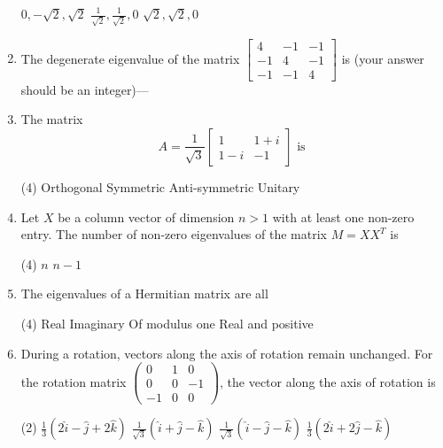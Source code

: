 \begin{enumerate}[label=\color{ocre}\textbf{\arabic*.}]
\begin{tasks}
		\task[\textbf{B.}] $0,-\sqrt{2}, \sqrt{2}$
		\task[\textbf{C.}]  $\frac{1}{\sqrt{2}}, \frac{1}{\sqrt{2}}, 0$
		\task[\textbf{D.}] $\sqrt{2}, \sqrt{2}, 0$
	\end{tasks}
	\item    The degenerate eigenvalue of the matrix $\left[\begin{array}{ccc}4 & -1 & -1 \\ -1 & 4 & -1 \\ -1 & -1 & 4\end{array}\right]$ is (your answer should be an
	integer)---
	{}
	\item  The matrix
	$$
	A=\frac{1}{\sqrt{3}}\left[\begin{array}{cc}
	1 & 1+i \\
	1-i & -1
	\end{array}\right] \text { is }
	$$
	{}
	\begin{tasks}(4)
		\task[\textbf{A.}] Orthogonal
		\task[\textbf{B.}] Symmetric
		\task[\textbf{C.}]  Anti-symmetric
		\task[\textbf{D.}]  Unitary
	\end{tasks}
	\item  Let $X$ be a column vector of dimension $n>1$ with at least one non-zero entry. The number of non-zero eigenvalues of the matrix $M=X X^{T}$ is
	{}
	 \begin{tasks}(4)
	 	\task[\textbf{B.}] $n$
	 	\task[\textbf{D.}] $n-1$
	 \end{tasks}
	 \item The eigenvalues of a Hermitian matrix are all
	 {}
	 \begin{tasks}(4)
	 	\task[\textbf{A.}]  Real
	 	\task[\textbf{B.}] Imaginary
	 	\task[\textbf{C.}] Of modulus one
	 	\task[\textbf{D.}] Real and positive
	 \end{tasks}
	 \item During a rotation, vectors along the axis of rotation remain unchanged. For the rotation matrix $\left(\begin{array}{ccc}0 & 1 & 0 \\ 0 & 0 & -1 \\ -1 & 0 & 0\end{array}\right)$, the vector along the axis of rotation is
	 {}
	 \begin{tasks}(2)
	 	\task[\textbf{A.}] $\frac{1}{3}(2 \hat{i}-\hat{j}+2 \hat{k})$
	 	\task[\textbf{B.}]  $\frac{1}{\sqrt{3}}(\hat{i}+\hat{j}-\hat{k})$
	 	\task[\textbf{C.}] $\frac{1}{\sqrt{3}}(\hat{i}-\hat{j}-\hat{k})$
	 	\task[\textbf{D.}] $\frac{1}{3}(2 \hat{i}+2 \hat{j}-\hat{k})$
	 \end{tasks}
\end{enumerate}
